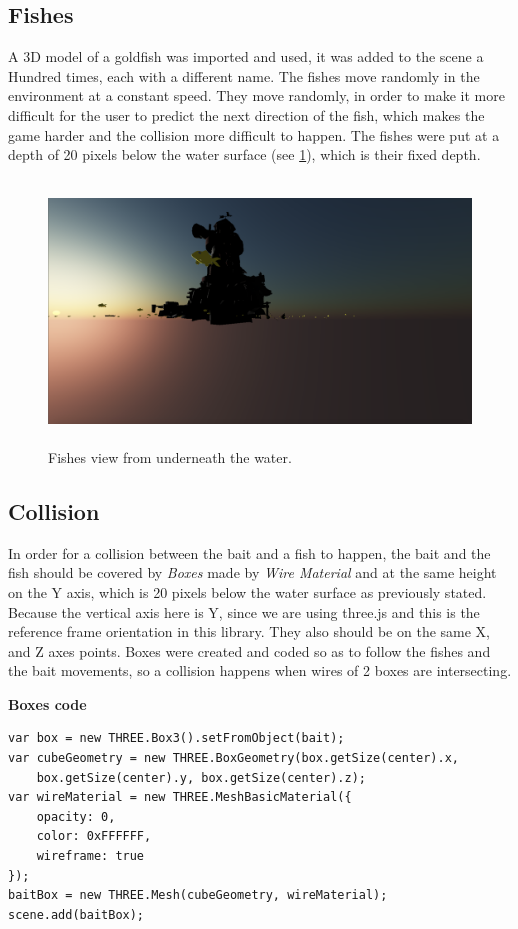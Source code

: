 \documentclass[paper=a4, fontsize=11pt]{scrartcl} %
\numberwithin{equation}{section} %
\numberwithin{figure}{section} %
\numberwithin{table}{section} %
\begin{document}
\subsection{Fishes}

A 3D model of a goldfish was imported and used, it was added to the scene a Hundred times, each with a different name. The fishes move randomly in the environment at a constant speed. They move randomly, in order to make it more difficult for the user to predict the next direction of the fish, which makes the game harder and the collision more difficult to happen. The fishes were put at a depth of 20 pixels below the water surface (see \ref{fishes}), which is their fixed depth. 

\begin{figure}[!ht]
\centering
\includegraphics[width=15cm, height=7cm]{images/fishes.png}
\caption{Fishes view from underneath the water.}
\label{fishes}
\end{figure}
\newpage
\subsection{Collision}

In order for a collision between the bait and a fish to happen, the bait and the fish should be covered by \textit{Boxes} made by \textit{Wire Material} and at the same height on the Y axis, which is 20 pixels below the water surface as previously stated. Because the vertical axis here is Y, since we are using three.js and this is the reference frame orientation in this library. They also should be on the same X, and Z axes points. Boxes were created and coded so as to follow the fishes and the bait movements, so a collision happens when wires of 2 boxes are intersecting. 
\newline

\textbf{Boxes code}
\begin{verbatim}
var box = new THREE.Box3().setFromObject(bait);
var cubeGeometry = new THREE.BoxGeometry(box.getSize(center).x, 
    box.getSize(center).y, box.getSize(center).z);
var wireMaterial = new THREE.MeshBasicMaterial({
    opacity: 0,
    color: 0xFFFFFF,
    wireframe: true
});
baitBox = new THREE.Mesh(cubeGeometry, wireMaterial);
scene.add(baitBox);
\end{verbatim}
\par
\end{document}
